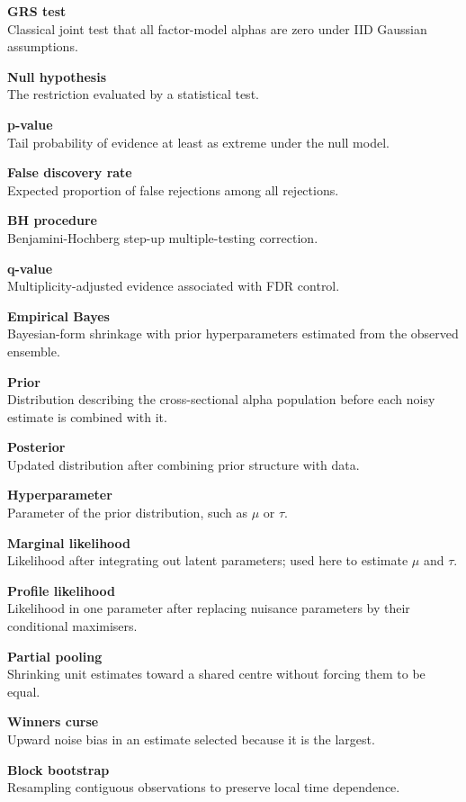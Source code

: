 \textbf{GRS test}\\
Classical joint test that all factor-model alphas are zero under IID
Gaussian assumptions.

\textbf{Null hypothesis}\\
The restriction evaluated by a statistical test.

\textbf{p-value}\\
Tail probability of evidence at least as extreme under the null model.

\textbf{False discovery rate}\\
Expected proportion of false rejections among all rejections.

\textbf{BH procedure}\\
Benjamini-Hochberg step-up multiple-testing correction.

\textbf{q-value}\\
Multiplicity-adjusted evidence associated with FDR control.

\textbf{Empirical Bayes}\\
Bayesian-form shrinkage with prior hyperparameters estimated from the
observed ensemble.

\textbf{Prior}\\
Distribution describing the cross-sectional alpha population before each
noisy estimate is combined with it.

\textbf{Posterior}\\
Updated distribution after combining prior structure with data.

\textbf{Hyperparameter}\\
Parameter of the prior distribution, such as \ensuremath{\mu } or \ensuremath{\tau }.

\textbf{Marginal likelihood}\\
Likelihood after integrating out latent parameters; used here to
estimate \ensuremath{\mu } and \ensuremath{\tau }.

\textbf{Profile likelihood}\\
Likelihood in one parameter after replacing nuisance parameters by their
conditional maximisers.

\textbf{Partial pooling}\\
Shrinking unit estimates toward a shared centre without forcing them to
be equal.

\textbf{Winner\textquotesingle s curse}\\
Upward noise bias in an estimate selected because it is the largest.

\textbf{Block bootstrap}\\
Resampling contiguous observations to preserve local time dependence.

